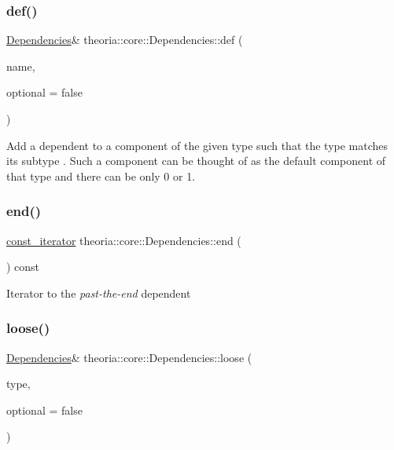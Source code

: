 \subsubsection{\texorpdfstring{def()}{def()}}
{\footnotesize\ttfamily \hyperlink{classtheoria_1_1core_1_1Dependencies}{Dependencies}\& theoria\+::core\+::\+Dependencies\+::def (\begin{DoxyParamCaption}\item[{const Type\+Name \&}]{name,  }\item[{bool}]{optional = {\ttfamily false} }\end{DoxyParamCaption})\hspace{0.3cm}{\ttfamily [inline]}}

Add a dependent to a component of the given type such that the type matches it\textquotesingle{}s subtype . Such a component can be thought of as the default component of that type and there can be only 0 or 1. \mbox{\label{classtheoria_1_1core_1_1Dependencies_ae1acd1d0962abda73cb1a46447dd4a5e}} 
\subsubsection{\texorpdfstring{end()}{end()}}
{\footnotesize\ttfamily \hyperlink{classtheoria_1_1core_1_1Dependencies_af58b879e807df8fb52b96c9ab1eb6073}{const\+\_\+iterator} theoria\+::core\+::\+Dependencies\+::end (\begin{DoxyParamCaption}{ }\end{DoxyParamCaption}) const\hspace{0.3cm}{\ttfamily [inline]}}

Iterator to the {\itshape past-\/the-\/end} dependent \mbox{\label{classtheoria_1_1core_1_1Dependencies_afa22a8f9fc20d3ce417bac397ba22e7a}} 
\subsubsection{\texorpdfstring{loose()}{loose()}}
{\footnotesize\ttfamily \hyperlink{classtheoria_1_1core_1_1Dependencies}{Dependencies}\& theoria\+::core\+::\+Dependencies\+::loose (\begin{DoxyParamCaption}\item[{const Type\+Name \&}]{type,  }\item[{bool}]{optional = {\ttfamily false} }\end{DoxyParamCaption})\hspace{0.3cm}{\ttfamily [inline]}}

